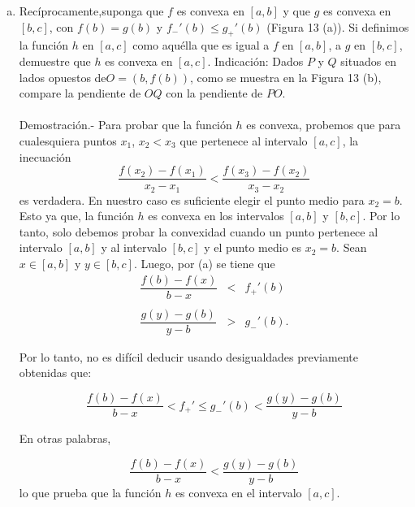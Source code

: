 \begin{enumerate}[\bfseries 1.]
\begin{enumerate}[(a)]
	    \item Recíprocamente,suponga que $f$ es convexa en $[a, b]$ y que $g$ es convexa en $[b, c]$, con $f(b) = g(b)$ y $f_-'(b)\leq g_+'(b)$ (Figura 13 (a)). Si definimos la función $h$ en $[a, c]$ como aquélla que es igual a $f$ en $[a,b]$, a $g$ en $[b,c]$, demuestre que $h$ es convexa en $[a, c]$. Indicación: Dados $P$ y $Q$ situados en lados opuestos de$O=(b, f(b))$, como se muestra en la Figura 13 (b), compare la pendiente de $OQ$ con la pendiente de $PO$.\\\\
		Demostración.-\; Para probar que la función $h$ es convexa, probemos que para cualesquiera puntos $x_1$, $x_2<x_3$ que pertenece al intervalo $[a,c]$, la inecuación 
		$$\dfrac{f(x_2)-f(x_1)}{x_2-x_1}<\dfrac{f(x_3)-f(x_2)}{x_3-x_2}$$
		es verdadera. En nuestro caso es suficiente elegir el punto medio para $x_2=b$. Esto ya que, la función $h$ es convexa en los intervalos $[a,b]$ y $[b,c]$. Por lo tanto, solo debemos probar la convexidad cuando un punto pertenece al intervalo $[a,b]$ y al intervalo $[b,c]$ y el punto medio es $x_2=b$. Sean $x\in [a,b]$ y $y\in [b,c]$. Luego, por (a) se tiene que
		$$
		\begin{array}{rcl}
		    \dfrac{f(b)-f(x)}{b-x} &<& f_+'(b)\\\\
		    \dfrac{g(y)-g(b)}{y-b} &>& g_-'(b).
		\end{array}
		$$

		Por lo tanto, no es difícil deducir usando desigualdades previamente obtenidas que:

		$$\dfrac{f(b)-f(x)}{b-x}<f_+'\leq g_-'(b)<\dfrac{g(y)-g(b)}{y-b}$$

		En otras palabras,

		$$\dfrac{f(b)-f(x)}{b-x}<\dfrac{g(y)-g(b)}{y-b}$$
		lo que prueba que la función $h$ es convexa en el intervalo $[a,c]$.\\\\



\end{enumerate}
\end{enumerate}
